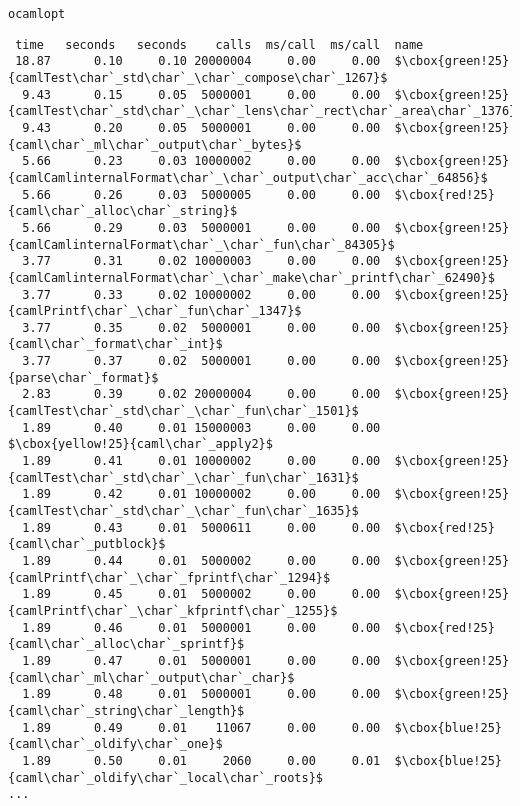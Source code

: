 \texttt{ocamlopt}
\begin{lstlisting}[basicstyle=\linespread{0.8}\ttfamily\footnotesize,
basewidth={.4em,.2em}, frame=single]
  %   cumulative   self              self     total           
 time   seconds   seconds    calls  ms/call  ms/call  name    
 18.87      0.10     0.10 20000004     0.00     0.00  $\cbox{green!25}{camlTest\char`_std\char`_\char`_compose\char`_1267}$
  9.43      0.15     0.05  5000001     0.00     0.00  $\cbox{green!25}{camlTest\char`_std\char`_\char`_lens\char`_rect\char`_area\char`_1376}$
  9.43      0.20     0.05  5000001     0.00     0.00  $\cbox{green!25}{caml\char`_ml\char`_output\char`_bytes}$
  5.66      0.23     0.03 10000002     0.00     0.00  $\cbox{green!25}{camlCamlinternalFormat\char`_\char`_output\char`_acc\char`_64856}$
  5.66      0.26     0.03  5000005     0.00     0.00  $\cbox{red!25}{caml\char`_alloc\char`_string}$
  5.66      0.29     0.03  5000001     0.00     0.00  $\cbox{green!25}{camlCamlinternalFormat\char`_\char`_fun\char`_84305}$
  3.77      0.31     0.02 10000003     0.00     0.00  $\cbox{green!25}{camlCamlinternalFormat\char`_\char`_make\char`_printf\char`_62490}$
  3.77      0.33     0.02 10000002     0.00     0.00  $\cbox{green!25}{camlPrintf\char`_\char`_fun\char`_1347}$
  3.77      0.35     0.02  5000001     0.00     0.00  $\cbox{green!25}{caml\char`_format\char`_int}$
  3.77      0.37     0.02  5000001     0.00     0.00  $\cbox{green!25}{parse\char`_format}$
  2.83      0.39     0.02 20000004     0.00     0.00  $\cbox{green!25}{camlTest\char`_std\char`_\char`_fun\char`_1501}$
  1.89      0.40     0.01 15000003     0.00     0.00  $\cbox{yellow!25}{caml\char`_apply2}$
  1.89      0.41     0.01 10000002     0.00     0.00  $\cbox{green!25}{camlTest\char`_std\char`_\char`_fun\char`_1631}$
  1.89      0.42     0.01 10000002     0.00     0.00  $\cbox{green!25}{camlTest\char`_std\char`_\char`_fun\char`_1635}$
  1.89      0.43     0.01  5000611     0.00     0.00  $\cbox{red!25}{caml\char`_putblock}$
  1.89      0.44     0.01  5000002     0.00     0.00  $\cbox{green!25}{camlPrintf\char`_\char`_fprintf\char`_1294}$
  1.89      0.45     0.01  5000002     0.00     0.00  $\cbox{green!25}{camlPrintf\char`_\char`_kfprintf\char`_1255}$
  1.89      0.46     0.01  5000001     0.00     0.00  $\cbox{red!25}{caml\char`_alloc\char`_sprintf}$
  1.89      0.47     0.01  5000001     0.00     0.00  $\cbox{green!25}{caml\char`_ml\char`_output\char`_char}$
  1.89      0.48     0.01  5000001     0.00     0.00  $\cbox{green!25}{caml\char`_string\char`_length}$
  1.89      0.49     0.01    11067     0.00     0.00  $\cbox{blue!25}{caml\char`_oldify\char`_one}$
  1.89      0.50     0.01     2060     0.00     0.01  $\cbox{blue!25}{caml\char`_oldify\char`_local\char`_roots}$
...
\end{lstlisting}

